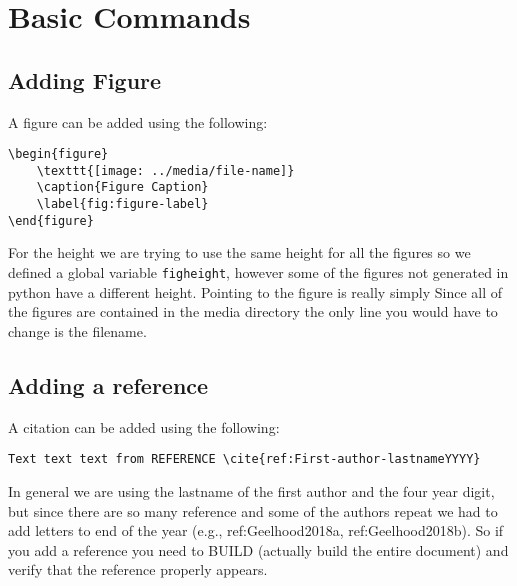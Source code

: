 \documentclass[12pt]{article}
\begin{document}
\section{Basic Commands}
\subsection{Adding Figure}
A figure can be added using the following:
\begin{verbatim}
\begin{figure}
    \texttt{[image: ../media/file-name]}
    \caption{Figure Caption}
    \label{fig:figure-label}
\end{figure}
\end{verbatim}
For the height we are trying to use the same height for all the figures so we defined a global
variable \texttt{figheight}, however some of the figures not generated in python have a different
height. Pointing to the figure is really simply Since all of the figures are contained in the media
directory the only line you would have to change is the filename.
\subsection{Adding a reference}
A citation can be added using the following:
\begin{verbatim}
Text text text from REFERENCE \cite{ref:First-author-lastnameYYYY}
\end{verbatim}
In general we are using the lastname of the first author and the four year digit, but since there
are so many reference and some of the authors repeat we had to add letters to end of the year (e.g., ref:Geelhood2018a,
ref:Geelhood2018b). So if you add a reference you need to BUILD (actually build the entire document)
and verify that the reference properly appears.
\end{document}
